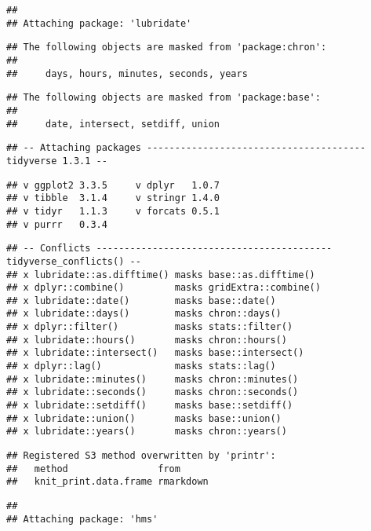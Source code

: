 \documentclass[
]{article}
\begin{document}
\begin{verbatim}
## 
## Attaching package: 'lubridate'
\end{verbatim}

\begin{verbatim}
## The following objects are masked from 'package:chron':
## 
##     days, hours, minutes, seconds, years
\end{verbatim}

\begin{verbatim}
## The following objects are masked from 'package:base':
## 
##     date, intersect, setdiff, union
\end{verbatim}

\begin{verbatim}
## -- Attaching packages --------------------------------------- tidyverse 1.3.1 --
\end{verbatim}

\begin{verbatim}
## v ggplot2 3.3.5     v dplyr   1.0.7
## v tibble  3.1.4     v stringr 1.4.0
## v tidyr   1.1.3     v forcats 0.5.1
## v purrr   0.3.4
\end{verbatim}

\begin{verbatim}
## -- Conflicts ------------------------------------------ tidyverse_conflicts() --
## x lubridate::as.difftime() masks base::as.difftime()
## x dplyr::combine()         masks gridExtra::combine()
## x lubridate::date()        masks base::date()
## x lubridate::days()        masks chron::days()
## x dplyr::filter()          masks stats::filter()
## x lubridate::hours()       masks chron::hours()
## x lubridate::intersect()   masks base::intersect()
## x dplyr::lag()             masks stats::lag()
## x lubridate::minutes()     masks chron::minutes()
## x lubridate::seconds()     masks chron::seconds()
## x lubridate::setdiff()     masks base::setdiff()
## x lubridate::union()       masks base::union()
## x lubridate::years()       masks chron::years()
\end{verbatim}

\begin{verbatim}
## Registered S3 method overwritten by 'printr':
##   method                from     
##   knit_print.data.frame rmarkdown
\end{verbatim}

\begin{verbatim}
## 
## Attaching package: 'hms'
\end{verbatim}
\end{document}
